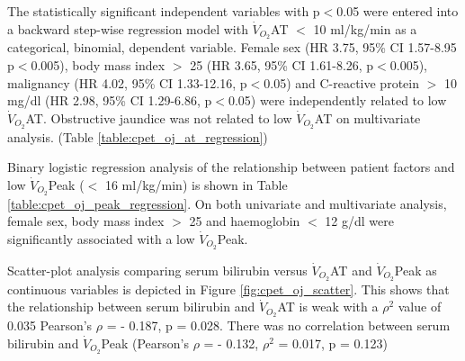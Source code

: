 The statistically significant independent variables with p$<$0.05 were entered into a backward step-wise regression model with $\dot{V}_{O_2}$AT $<$ 10 ml/kg/min as a categorical, binomial, dependent variable. 
Female sex (HR 3.75, 95\% CI 1.57-8.95 p$<$0.005), body mass index $>$ 25 (HR 3.65, 95\% CI 1.61-8.26, p$<$0.005), malignancy (HR 4.02, 95\% CI 1.33-12.16, p$<$0.05) and C-reactive protein $>$ 10 mg/dl (HR 2.98, 95\% CI 1.29-6.86, p$<$0.05) were independently related to low $\dot{V}_{O_2}$AT. 
Obstructive jaundice was not related to low $\dot{V}_{O_2}$AT on multivariate analysis. (Table \ref{table:cpet_oj_at_regression})

Binary logistic regression analysis of the relationship between patient factors and low $\dot{V}_{O_2}$Peak ($<$ 16 ml/kg/min) is shown in Table \ref{table:cpet_oj_peak_regression}. 
On both univariate and multivariate analysis, female sex, body mass index $>$ 25 and haemoglobin $<$ 12 g/dl were significantly associated with a low $\dot{V}_{O_2}$Peak. 




\clearpage

Scatter-plot analysis comparing serum bilirubin versus $\dot{V}_{O_2}$AT and $\dot{V}_{O_2}$Peak as continuous variables is depicted in Figure \ref{fig:cpet_oj_scatter}. 
This shows that the relationship between serum bilirubin and $\dot{V}_{O_2}$AT is weak with a $\rho^2$ value of 0.035 Pearson's $\rho$ = - 0.187, p = 0.028. 
There was no correlation between serum bilirubin and $\dot{V}_{O_2}$Peak (Pearson's $\rho$ = - 0.132, $\rho^2$ = 0.017, p = 0.123)


